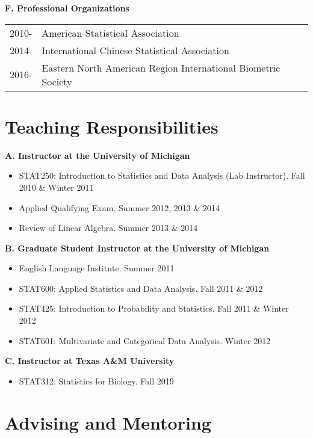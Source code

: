 \documentclass[10pt]{article}
\begin{document}
\textbf{F. Professional Organizations}

\begin{table}[H]
\hskip0.9cm\begin{tabular}{p{1.6cm}p{12cm}}
2010- & American Statistical Association\\
2014- & International Chinese Statistical Association\\
2016- & Eastern North American Region International Biometric Society
\end{tabular}
\end{table}


\section*{Teaching Responsibilities}

\textbf{A. Instructor at the University of Michigan}
\begin{itemize} 
\item STAT250: Introduction to Statistics and Data Analysis (Lab Instructor). Fall 2010 \& Winter 2011
\item Applied Qualifying Exam. Summer 2012, 2013 \& 2014
\item Review of Linear Algebra. Summer 2013 \& 2014
\end{itemize}

\textbf{B. Graduate Student Instructor at the University of Michigan}
\begin{itemize}  
\item English Language Institute. Summer 2011
\item STAT600: Applied Statistics and Data Analysis. Fall 2011 \& 2012
\item STAT425: Introduction to Probability and Statistics. Fall 2011 \& Winter 2012
\item STAT601: Multivariate and Categorical Data Analysis. Winter 2012
\end{itemize}

\textbf{C. Instructor at Texas A\&M University}
\begin{itemize} 
\item STAT312: Statistics for Biology. Fall 2019
\end{itemize}

\section*{Advising and Mentoring}
\end{document}

